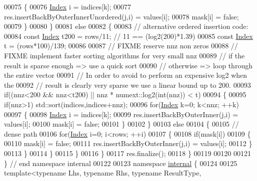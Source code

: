 \begin{DoxyCode}
00075       \{
00076         \hyperlink{namespace_eigen_a62e77e0933482dafde8fe197d9a2cfde}{Index} i = indices[k];
00077         res.insertBackByOuterInnerUnordered(j,i) = values[i];
00078         mask[i] = \textcolor{keyword}{false};
00079       \}
00080     \}
00081     \textcolor{keywordflow}{else}
00082     \{
00083       \textcolor{comment}{// alternative ordered insertion code:}
00084       \textcolor{keyword}{const} \hyperlink{namespace_eigen_a62e77e0933482dafde8fe197d9a2cfde}{Index} t200 = rows/11; \textcolor{comment}{// 11 == (log2(200)*1.39)}
00085       \textcolor{keyword}{const} \hyperlink{namespace_eigen_a62e77e0933482dafde8fe197d9a2cfde}{Index} t = (rows*100)/139;
00086 
00087       \textcolor{comment}{// FIXME reserve nnz non zeros}
00088       \textcolor{comment}{// FIXME implement faster sorting algorithms for very small nnz}
00089       \textcolor{comment}{// if the result is sparse enough => use a quick sort}
00090       \textcolor{comment}{// otherwise => loop through the entire vector}
00091       \textcolor{comment}{// In order to avoid to perform an expensive log2 when the}
00092       \textcolor{comment}{// result is clearly very sparse we use a linear bound up to 200.}
00093       \textcolor{keywordflow}{if}((nnz<200 && nnz<t200) || nnz * numext::log2(\textcolor{keywordtype}{int}(nnz)) < t)
00094       \{
00095         \textcolor{keywordflow}{if}(nnz>1) std::sort(indices,indices+nnz);
00096         \textcolor{keywordflow}{for}(\hyperlink{namespace_eigen_a62e77e0933482dafde8fe197d9a2cfde}{Index} k=0; k<nnz; ++k)
00097         \{
00098           \hyperlink{namespace_eigen_a62e77e0933482dafde8fe197d9a2cfde}{Index} i = indices[k];
00099           res.insertBackByOuterInner(j,i) = values[i];
00100           mask[i] = \textcolor{keyword}{false};
00101         \}
00102       \}
00103       \textcolor{keywordflow}{else}
00104       \{
00105         \textcolor{comment}{// dense path}
00106         \textcolor{keywordflow}{for}(\hyperlink{namespace_eigen_a62e77e0933482dafde8fe197d9a2cfde}{Index} i=0; i<rows; ++i)
00107         \{
00108           \textcolor{keywordflow}{if}(mask[i])
00109           \{
00110             mask[i] = \textcolor{keyword}{false};
00111             res.insertBackByOuterInner(j,i) = values[i];
00112           \}
00113         \}
00114       \}
00115     \}
00116   \}
00117   res.finalize();
00118 \}
00119 
00120 
00121 \} \textcolor{comment}{// end namespace internal}
00122 
00123 \textcolor{keyword}{namespace }\hyperlink{namespaceinternal}{internal} \{
00124 
00125 \textcolor{keyword}{template}<\textcolor{keyword}{typename} Lhs, \textcolor{keyword}{typename} Rhs, \textcolor{keyword}{typename} ResultType,

\end{DoxyCode}
